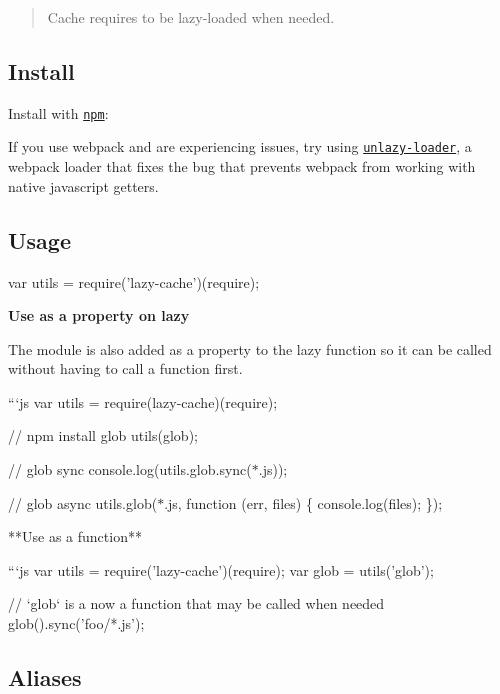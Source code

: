 \begin{quote}
Cache requires to be lazy-\/loaded when needed. \end{quote}


\subsection*{Install}

Install with \href{https://www.npmjs.com/}{\tt npm}\+:




If you use webpack and are experiencing issues, try using \href{https://github.com/doowb/unlazy-loader}{\tt unlazy-\/loader}, a webpack loader that fixes the bug that prevents webpack from working with native javascript getters.

\subsection*{Usage}


\begin{DoxyCode}
var utils = require('lazy-cache')(require);
\end{DoxyCode}


{\bfseries Use as a property on {\ttfamily lazy}}

The module is also added as a property to the {\ttfamily lazy} function so it can be called without having to call a function first.

```js var utils = require(\textquotesingle{}lazy-\/cache\textquotesingle{})(require);

// {\ttfamily npm install glob} utils(\textquotesingle{}glob\textquotesingle{});

// glob sync console.\+log(utils.\+glob.\+sync(\textquotesingle{}$\ast$.js\textquotesingle{}));

// glob async utils.\+glob(\textquotesingle{}$\ast$.js\textquotesingle{}, function (err, files) \{ console.\+log(files); \}); 
\begin{DoxyCode}
**Use as a function**

```js
var utils = require('lazy-cache')(require);
var glob = utils('glob');

// `glob` is a now a function that may be called when needed
glob().sync('foo/*.js');
\end{DoxyCode}


\subsection*{Aliases}

